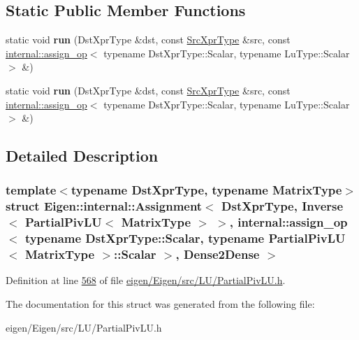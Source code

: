 \subsection*{Static Public Member Functions}
\begin{DoxyCompactItemize}
\item 
\mbox{\label{struct_eigen_1_1internal_1_1_assignment_3_01_dst_xpr_type_00_01_inverse_3_01_partial_piv_l_u_3_0fe0876a690a87045a6eaca571908231d_acd231757f32088e6544b2f6bb0eb9e6b}} 
static void {\bfseries run} (Dst\+Xpr\+Type \&dst, const \hyperlink{class_eigen_1_1_inverse}{Src\+Xpr\+Type} \&src, const \hyperlink{struct_eigen_1_1internal_1_1assign__op}{internal\+::assign\+\_\+op}$<$ typename Dst\+Xpr\+Type\+::\+Scalar, typename Lu\+Type\+::\+Scalar $>$ \&)
\item 
\mbox{\label{struct_eigen_1_1internal_1_1_assignment_3_01_dst_xpr_type_00_01_inverse_3_01_partial_piv_l_u_3_0fe0876a690a87045a6eaca571908231d_acd231757f32088e6544b2f6bb0eb9e6b}} 
static void {\bfseries run} (Dst\+Xpr\+Type \&dst, const \hyperlink{class_eigen_1_1_inverse}{Src\+Xpr\+Type} \&src, const \hyperlink{struct_eigen_1_1internal_1_1assign__op}{internal\+::assign\+\_\+op}$<$ typename Dst\+Xpr\+Type\+::\+Scalar, typename Lu\+Type\+::\+Scalar $>$ \&)
\end{DoxyCompactItemize}


\subsection{Detailed Description}
\subsubsection*{template$<$typename Dst\+Xpr\+Type, typename Matrix\+Type$>$\newline
struct Eigen\+::internal\+::\+Assignment$<$ Dst\+Xpr\+Type, Inverse$<$ Partial\+Piv\+L\+U$<$ Matrix\+Type $>$ $>$, internal\+::assign\+\_\+op$<$ typename Dst\+Xpr\+Type\+::\+Scalar, typename Partial\+Piv\+L\+U$<$ Matrix\+Type $>$\+::\+Scalar $>$, Dense2\+Dense $>$}



Definition at line \hyperlink{eigen_2_eigen_2src_2_l_u_2_partial_piv_l_u_8h_source_l00568}{568} of file \hyperlink{eigen_2_eigen_2src_2_l_u_2_partial_piv_l_u_8h_source}{eigen/\+Eigen/src/\+L\+U/\+Partial\+Piv\+L\+U.\+h}.



The documentation for this struct was generated from the following file\+:\begin{DoxyCompactItemize}
\item 
eigen/\+Eigen/src/\+L\+U/\+Partial\+Piv\+L\+U.\+h\end{DoxyCompactItemize}
